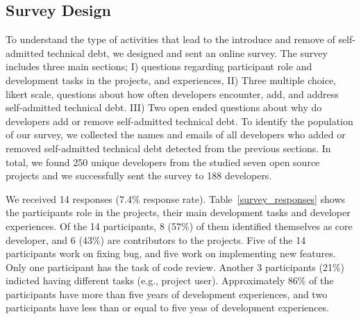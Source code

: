 \subsection{Survey Design}
\label{Survey_Design}
To understand the type of activities that lead to the introduce and remove of self-admitted technical debt, we designed and sent an online survey. The survey includes three main sections; I)  questions regarding 
participant role and development tasks in the projects, and experiences, II) Three multiple choice, likert scale, questions about how often developers encounter, add, and address self-admitted technical debt. III) Two open ended questions about why do developers add or remove self-admitted technical debt. To identify the population of our survey, we collected the names and emails of all developers who added or removed self-admitted technical debt detected from the previous sections. In total, we found 250 unique developers from the studied seven open source projects and we successfully sent the survey to 188 developers.  

We received 14 responses (7.4\% response rate). Table~\ref{survey_responses} shows the participants role in the projects, their main development tasks and developer experiences. Of the 14 participants, 8 (57\%) of them identified themselves as core developer, and 6 (43\%) are contributors to the projects. Five of the 14 participants work on fixing bug, and five work on implementing new features. Only one participant has the task of code review. Another 3 participants (21\%) indicted having different tasks (e.g., project user). Approximately 86\% of the participants have more than five years of development experiences, and two participants have less than or equal to five yeas of development experiences.





